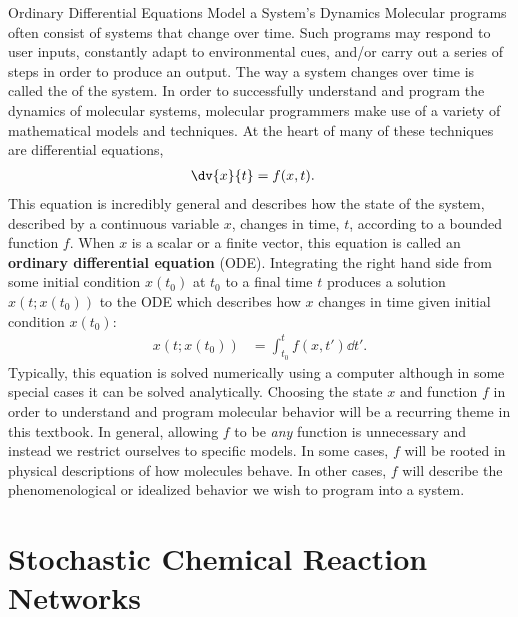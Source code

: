 \begin{breakout}[label=box:dynamics]{Ordinary Differential Equations Model a System's Dynamics}
Molecular programs often consist of systems that change over time. Such programs may respond to user inputs, constantly adapt to environmental cues, and/or carry out a series of steps in order to produce an output. The way a system changes over time is called the  of the system. In order to successfully understand and program the dynamics of molecular systems, molecular programmers make use of a variety of mathematical models and techniques. At the heart of many of these techniques are differential equations,
%
\begin{align*}
    \dv{x}{t} &= f(x, t).
\end{align*}
%
This equation is incredibly general and describes how the state of the system, described by a continuous variable $x$, changes in time, $t$, according to a bounded function $f$. When $x$ is a scalar or a finite vector, this equation is called an \textbf{ordinary differential equation} (ODE). Integrating the right hand side from some initial condition $x(t_0)$ at $t_0$ to a final time $t$ produces a solution $x(t; x(t_0))$ to the ODE which describes how $x$ changes in time given initial condition $x(t_0)$:
\begin{align*}
    x(t; x(t_0)) &= \int_{t_0}^{t} f(x, t') \dd{t'}.
\end{align*}
Typically, this equation is solved numerically using a computer although in some special cases it can be solved analytically. Choosing the state $x$ and function $f$ in order to understand and program molecular behavior will be a recurring theme in this textbook.
In general, allowing $f$ to be \emph{any} function is unnecessary and instead we restrict ourselves to specific models. In some cases, $f$ will be rooted in physical descriptions of how molecules behave. In other cases, $f$ will describe the phenomenological or idealized behavior we wish to program into a system. 
\end{breakout}

\section{Stochastic Chemical Reaction Networks}

